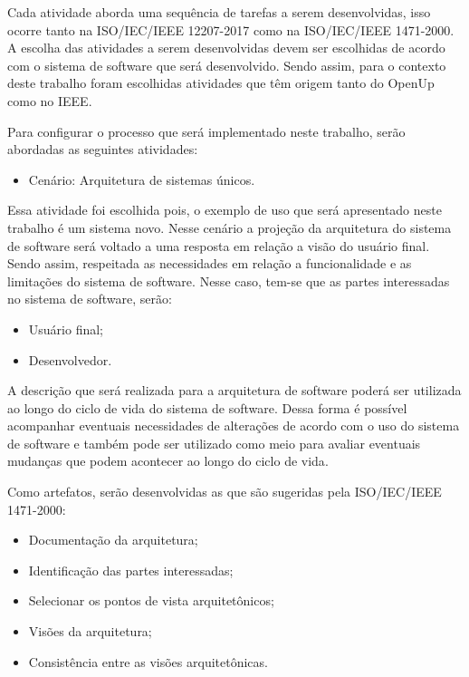 Cada atividade aborda uma sequência de tarefas a serem desenvolvidas, isso ocorre tanto na ISO/IEC/IEEE 12207-2017 como na ISO/IEC/IEEE 1471-2000. A escolha das atividades a serem desenvolvidas devem ser escolhidas de acordo com o sistema de software que será desenvolvido. Sendo assim, para o contexto deste trabalho foram escolhidas atividades que têm origem tanto do \acrfull{OpenUp} como no \acrfull{IEEE}.

Para configurar o processo que será implementado neste trabalho, serão abordadas as seguintes atividades\cite{ISO_1471}:

\begin{itemize}
    \item  Cenário: Arquitetura de sistemas únicos.
\end{itemize}

Essa atividade foi escolhida pois, o exemplo de uso que será apresentado neste trabalho é um sistema novo. Nesse cenário a projeção da arquitetura do sistema de software será voltado a uma  resposta em relação a visão do usuário final. Sendo assim, respeitada as necessidades em relação a funcionalidade e as limitações do sistema de software. Nesse caso, tem-se que as partes interessadas no sistema de software, serão\cite{ISO_1471}:
\begin{itemize}
    \item Usuário final;
    \item Desenvolvedor.
\end{itemize}

A descrição que será realizada para a  arquitetura de software poderá ser utilizada ao longo do ciclo de vida do sistema de software. Dessa forma é possível acompanhar eventuais necessidades de alterações de acordo com o uso do sistema de software e também pode ser utilizado como meio para avaliar eventuais mudanças que podem acontecer ao longo do ciclo de vida\cite{ISO_1471}.

Como artefatos, serão desenvolvidas as que são sugeridas pela ISO/IEC/IEEE 1471-2000\cite{ISO_1471}:

\begin{itemize}
    \item Documentação da arquitetura;
    \item Identificação das partes interessadas;
    \item Selecionar os pontos de vista arquitetônicos;
    \item Visões da arquitetura;
    \item Consistência entre as visões arquitetônicas.
\end{itemize}

